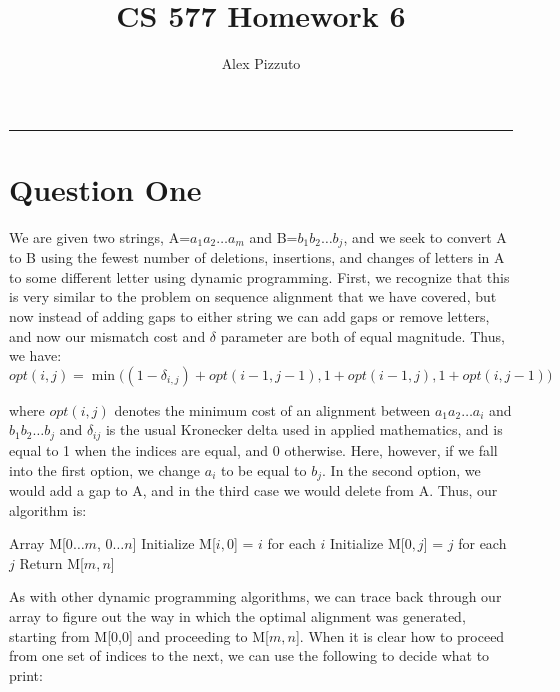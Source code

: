 \documentclass[11pt,letterpaper]{article}
\author{Alex Pizzuto}
\title{CS 577 Homework 6}
\begin{document}
\date{}
\maketitle
\hrule

\section*{Question One}
We are given two strings, A=$a_1a_2\ldots a_m$ and B=$b_1b_2\ldots b_j$, and we seek to convert A to B using the fewest number of deletions, insertions, and changes of letters in A to some different letter using dynamic programming. First, we recognize that this is very similar to the problem on sequence alignment that we have covered, but now instead of adding gaps to either string we can add gaps or remove letters, and now our mismatch cost and $\delta$ parameter are both of equal magnitude. Thus, we have:
$$opt(i,j) = \min \Big( (1-\delta_{i,j}) + opt(i - 1, j - 1), 1+opt(i-1,j), 1+opt(i,j-1) \Big) $$

where $opt(i,j)$ denotes the minimum cost of an alignment between $a_1a_2\ldots a_i$ and $b_1b_2\ldots b_j$ and $\delta_{ij}$ is the usual Kronecker delta used in applied mathematics, and is equal to 1 when the indices are equal, and 0 otherwise. Here, however, if we fall into the first option, we change $a_i$ to be equal to $b_j$. In the second option, we would add a gap to A, and in the third case we would delete from A. Thus, our algorithm is:

\begin{algorithm}[H]
	Array M[0$\ldots m$, $0\ldots n$]\;
	Initialize M[$i,0$] = $i$ for each $i$\;
	Initialize M[$0,j$] = $j$ for each $j$\;
	Return M[$m,n$]\;
\end{algorithm}

As with other dynamic programming algorithms, we can trace back through our array to figure out the way in which the optimal alignment was generated, starting from M[0,0] and proceeding to M[$m,n$]. When it is clear how to proceed from one set of indices to the next, we can use the following to decide what to print:

\begin{algorithm}[H]
\end{algorithm}
\end{document}
